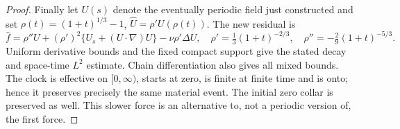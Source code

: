 \begin{proof}
Finally let $U(s)$ denote the eventually periodic field just constructed
and set $\rho(t)=(1+t)^{1/3}-1$, $\widehat U=\rho' U(\rho(t))$.
The new residual is
\[
 \widehat f=\rho''U+(\rho')^2\{U_s+(U\cdot\nabla)U\}
                          -\nu\rho'\Delta U,
 \quad \rho'=\tfrac13(1+t)^{-2/3},\quad
 \rho''=-\tfrac29(1+t)^{-5/3}.
\]
Uniform derivative bounds and the fixed compact support give the stated
decay and space-time $L^2$ estimate. Chain differentiation also gives all
mixed bounds. The clock is effective on $[0,\infty)$, starts at zero,
is finite at finite time and is onto; hence it preserves precisely the
same material event. The initial zero collar is preserved as well.
This slower force is an alternative to, not a periodic version of, the
first force.
\end{proof}

